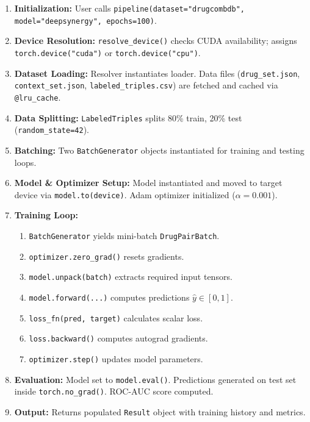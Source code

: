 \documentclass[12pt,a4paper,oneside]{article}
\begin{document}
\begin{enumerate}
  \item \textbf{Initialization:} User calls \texttt{pipeline(dataset="drugcombdb", model="deepsynergy", epochs=100)}.
  \item \textbf{Device Resolution:} \texttt{resolve\_device()} checks CUDA availability; assigns \texttt{torch.device("cuda")} or \texttt{torch.device("cpu")}.
  \item \textbf{Dataset Loading:} Resolver instantiates loader. Data files (\texttt{drug\_set.json}, \texttt{context\_set.json}, \texttt{labeled\_triples.csv}) are fetched and cached via \texttt{@lru\_cache}.
  \item \textbf{Data Splitting:} \texttt{LabeledTriples} splits 80\% train, 20\% test (\texttt{random\_state=42}).
  \item \textbf{Batching:} Two \texttt{BatchGenerator} objects instantiated for training and testing loops.
  \item \textbf{Model \& Optimizer Setup:} Model instantiated and moved to target device via \texttt{model.to(device)}. Adam optimizer initialized ($\alpha=0.001$).
  \item \textbf{Training Loop:}
  \begin{enumerate}[label=\roman*.]
    \item \texttt{BatchGenerator} yields mini-batch \texttt{DrugPairBatch}.
    \item \texttt{optimizer.zero\_grad()} resets gradients.
    \item \texttt{model.unpack(batch)} extracts required input tensors.
    \item \texttt{model.forward(...)} computes predictions $\hat{y} \in [0, 1]$.
    \item \texttt{loss\_fn(pred, target)} calculates scalar loss.
    \item \texttt{loss.backward()} computes autograd gradients.
    \item \texttt{optimizer.step()} updates model parameters.
  \end{enumerate}
  \item \textbf{Evaluation:} Model set to \texttt{model.eval()}. Predictions generated on test set inside \texttt{torch.no\_grad()}. ROC-AUC score computed.
  \item \textbf{Output:} Returns populated \texttt{Result} object with training history and metrics.
\end{enumerate}

\end{document}
